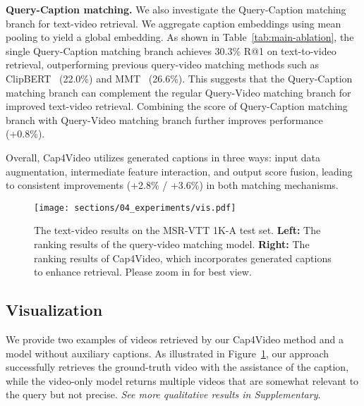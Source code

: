 \documentclass[10pt,twocolumn,letterpaper]{article}
\begin{document}
\noindent\textbf{Query-Caption matching.} 
We also investigate the Query-Caption matching branch for text-video retrieval. We aggregate caption embeddings using mean pooling to yield a global embedding. As shown in Table~\ref{tab:main-ablation}, the single Query-Caption matching branch achieves 30.3\% R@1 on text-to-video retrieval, outperforming previous query-video matching methods such as ClipBERT~\cite{lei2021clipbert} (22.0\%) and MMT~\cite{gabeur2020mmt} (26.6\%). This suggests that the Query-Caption matching branch can complement the regular Query-Video matching branch for improved text-video retrieval. Combining the score of Query-Caption matching branch with Query-Video matching branch further improves performance (+0.8\%).



Overall, Cap4Video utilizes generated captions in three ways: input data augmentation, intermediate feature interaction, and output score fusion, leading to consistent improvements (+2.8\% / +3.6\%) in both matching mechanisms.






\begin{figure}[t]
\begin{center}
\texttt{[image: sections/04\_experiments/vis.pdf]}
\end{center}
\vspace{-1em}
\caption{The text-video results on the MSR-VTT 1K-A test set. \textbf{Left:} The ranking results of the query-video matching model. \textbf{Right:} The ranking results of Cap4Video, which incorporates generated captions to enhance retrieval. Please zoom in for best view.
}
\label{fig:vis}
\end{figure}

\subsection{Visualization}
We provide two examples of videos retrieved by our Cap4Video method and a model without auxiliary captions. As illustrated in Figure~\ref{fig:vis}, our approach successfully retrieves the ground-truth video with the assistance of the caption, while the video-only model returns multiple videos that are somewhat relevant to the query but not precise. \emph{See more qualitative results in Supplementary}.
\end{document}
